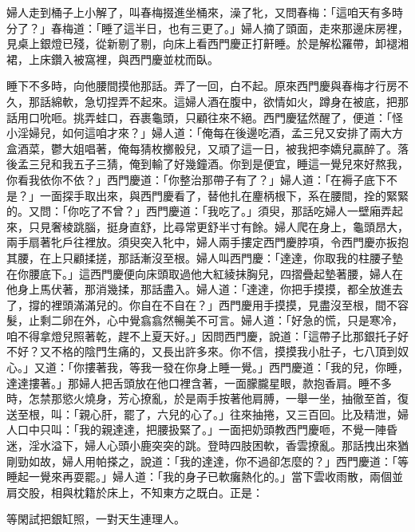 婦人走到桶子上小解了，叫春梅掇進坐桶來，澡了牝，又問春梅：「這咱天有多時分了？」春梅道：「睡了這半日，也有三更了。」婦人摘了頭面，走來那邊床房裡，見桌上銀燈已殘，從新剔了剔，向床上看西門慶正打鼾睡。於是解松羅帶，卸褪湘裙，上床鑽入被窩裡，與西門慶並枕而臥。

睡下不多時，向他腰間摸他那話。弄了一回，白不起。原來西門慶與春梅才行房不久，那話綿軟，急切捏弄不起來。這婦人酒在腹中，欲情如火，蹲身在被底，把那話用口吮咂。挑弄蛙口，吞裹龜頭，只顧往來不絕。西門慶猛然醒了，便道：「怪小淫婦兒，如何這咱才來？」婦人道：「俺每在後邊吃酒，孟三兒又安排了兩大方盒酒菜，鬱大姐唱著，俺每猜枚擲骰兒，又頑了這一日，被我把李嬌兒贏醉了。落後孟三兒和我五子三猜，俺到輸了好幾鐘酒。你到是便宜，睡這一覺兒來好熬我，你看我依你不依？」西門慶道：「你整治那帶子有了？」婦人道：「在褥子底下不是？」一面探手取出來，與西門慶看了，替他扎在麈柄根下，系在腰間，拴的緊緊的。又問：「你吃了不曾？」西門慶道：「我吃了。」須臾，那話吃婦人一壁廂弄起來，只見奢棱跳腦，挺身直舒，比尋常更舒半寸有餘。婦人爬在身上，龜頭昂大，兩手扇著牝戶往裡放。須臾突入牝中，婦人兩手摟定西門慶脖項，令西門慶亦扳抱其腰，在上只顧揉搓，那話漸沒至根。婦人叫西門慶：「達達，你取我的柱腰子墊在你腰底下。」這西門慶便向床頭取過他大紅綾抹胸兒，四摺疊起墊著腰，婦人在他身上馬伏著，那消幾揉，那話盡入。婦人道：「達達，你把手摸摸，都全放進去了，撐的裡頭滿滿兒的。你自在不自在？」西門慶用手摸摸，見盡沒至根，間不容髮，止剩二卵在外，心中覺翕翕然暢美不可言。婦人道：「好急的慌，只是寒冷，咱不得拿燈兒照著乾，趕不上夏天好。」因問西門慶，說道：「這帶子比那銀托子好不好？又不格的陰門生痛的，又長出許多來。你不信，摸摸我小肚子，七八頂到奴心。」又道：「你摟著我，等我一發在你身上睡一覺。」西門慶道：「我的兒，你睡，達達摟著。」那婦人把舌頭放在他口裡含著，一面朦朧星眼，款抱香肩。睡不多時，怎禁那慾火燒身，芳心撩亂，於是兩手按著他肩膊，一舉一坐，抽徹至首，復送至根，叫：「親心肝，罷了，六兒的心了。」往來抽捲，又三百回。比及精泄，婦人口中只叫：「我的親達達，把腰扱緊了。」一面把奶頭教西門慶咂，不覺一陣昏迷，淫水溢下，婦人心頭小鹿突突的跳。登時四肢困軟，香雲撩亂。那話拽出來猶剛勁如故，婦人用帕搽之，說道：「我的達達，你不過卻怎麼的？」西門慶道：「等睡起一覺來再耍罷。」婦人道：「我的身子已軟癱熱化的。」當下雲收雨散，兩個並肩交股，相與枕籍於床上，不知東方之既白。正是：

等閑試把銀缸照，一對天生連理人。

